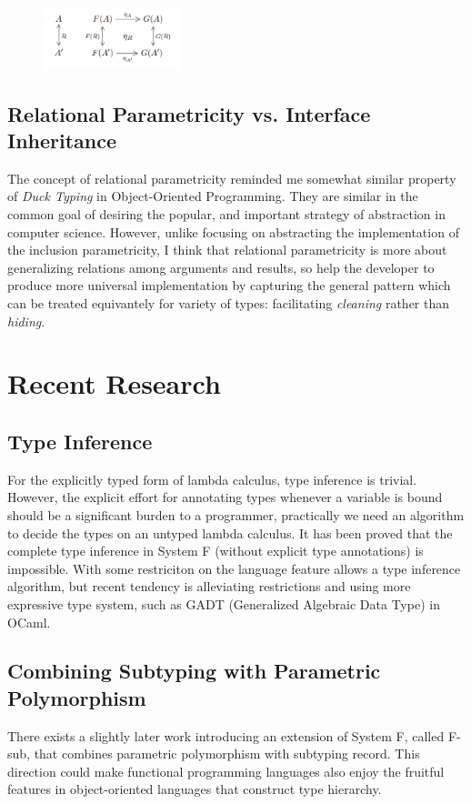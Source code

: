 \documentclass[sigconf]{acmart}
\begin{document}
\begin{figure}[!h]
  \includegraphics[width=150px]{images/commute.png}
\end{figure}

\subsection{Relational Parametricity vs. Interface Inheritance}
The concept of relational parametricity reminded me somewhat similar property of \textit{Duck Typing} in Object-Oriented Programming. They are similar in the common goal of desiring the popular, and important strategy of abstraction in computer science. However, unlike focusing on abstracting the implementation of the inclusion parametricity, I think that relational parametricity is more about generalizing relations among arguments and results, so help the developer to produce more universal implementation by capturing the general pattern which can be treated equivantely for variety of types: facilitating \textit{cleaning} rather than \textit{hiding}.



\section{Recent Research}
\label{sec:recent}


\subsection{Type Inference}
For the explicitly typed form of lambda calculus, type inference is trivial. However, the explicit effort for annotating types whenever a variable is bound should be a significant burden to a programmer, practically we need an algorithm to decide the types on an untyped lambda calculus. It has been proved that the complete type inference in System F (without explicit type annotations) is impossible. With some restriciton on the language feature allows a type inference algorithm, but recent tendency is alleviating restrictions and using more expressive type system, such as GADT (Generalized Algebraic Data Type) in OCaml. 

\subsection{Combining Subtyping with Parametric Polymorphism}
There exists a slightly later work introducing an extension of System F, called F-sub, that combines parametric polymorphism with subtyping record. This direction could make functional programming languages also enjoy the fruitful features in object-oriented languages that construct type hierarchy.
\end{document}
